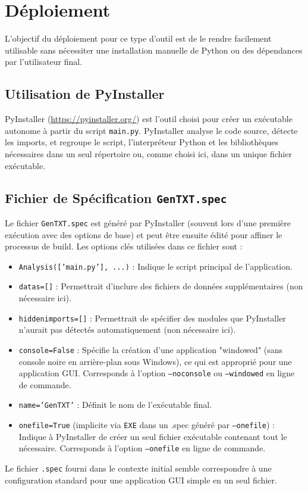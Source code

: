 \documentclass[11pt, a4paper]{article}
\begin{document}
\section{Déploiement}

L'objectif du déploiement pour ce type d'outil est de le rendre facilement utilisable sans nécessiter une installation manuelle de Python ou des dépendances par l'utilisateur final.

\subsection{Utilisation de PyInstaller}
PyInstaller (\url{https://pyinstaller.org/}) est l'outil choisi pour créer un exécutable autonome à partir du script \texttt{main.py}. PyInstaller analyse le code source, détecte les imports, et regroupe le script, l'interpréteur Python et les bibliothèques nécessaires dans un seul répertoire ou, comme choisi ici, dans un unique fichier exécutable.

\subsection{Fichier de Spécification \texttt{GenTXT.spec}}
Le fichier \texttt{GenTXT.spec} est généré par PyInstaller (souvent lors d'une première exécution avec des options de base) et peut être ensuite édité pour affiner le processus de build.
Les options clés utilisées dans ce fichier sont :
\begin{itemize}
    \item \texttt{Analysis(['main.py'], ...)} : Indique le script principal de l'application.
    \item \texttt{datas=[]} : Permettrait d'inclure des fichiers de données supplémentaires (non nécessaire ici).
    \item \texttt{hiddenimports=[]} : Permettrait de spécifier des modules que PyInstaller n'aurait pas détectés automatiquement (non nécessaire ici).
    \item \texttt{console=False} : Spécifie la création d'une application "windowed" (sans console noire en arrière-plan sous Windows), ce qui est approprié pour une application GUI. Corresponds à l'option \texttt{--noconsole} ou \texttt{--windowed} en ligne de commande.
    \item \texttt{name='GenTXT'} : Définit le nom de l'exécutable final.
    \item \texttt{onefile=True} (implicite via \texttt{EXE} dans un .spec généré par \texttt{--onefile}) : Indique à PyInstaller de créer un seul fichier exécutable contenant tout le nécessaire. Corresponds à l'option \texttt{--onefile} en ligne de commande.
\end{itemize}
Le fichier \texttt{.spec} fourni dans le contexte initial semble correspondre à une configuration standard pour une application GUI simple en un seul fichier.
\end{document}
